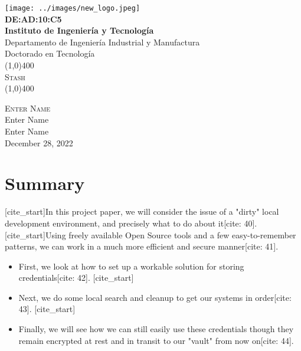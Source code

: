 \documentclass[11pt]{article}
\newcommand{\myTitle}{Stash}
\newcommand{\myName}{Enter Name}
\newcommand{\myClass}{Enter Name}
\newcommand{\myTecher}{Enter Name}
\newcommand{\myDate}{December 28, 2022}
\begin{document}
	
	\begin{titlepage}
		\begin{center}
			\texttt{[image: ../images/new\_logo.jpeg]}\\
			\huge{\textbf{DE:AD:10:C5}} \\
			[0.25in]
			
			\textbf{\Large{Instituto de Ingeniería y Tecnología}}\\
			\Large{Departamento de Ingeniería Industrial y Manufactura}\\
			\Large{Doctorado en Tecnología}\\
			[1in]
			
			\line(1,0){400}\\
			[2mm]
			\textsc{\Large{\myTitle}} \\
			\line(1,0){400} \\
			[1in]
		\end{center}
		\begin{center}
			\textsc{\Large \myName} \\
			\myClass\\
			\myTecher\\
			[1in]
			\myDate
		\end{center}
	\end{titlepage}
	
	\section*{Summary}
	
	[cite_start]In this project paper, we will consider the issue of a "dirty" local development environment, and precisely what to do about it[cite: 40]. [cite_start]Using freely available Open Source tools and a few easy-to-remember patterns, we can work in a much more efficient and secure manner[cite: 41].
	
	\begin{itemize}
		[cite_start]\item First, we look at how to set up a workable solution for storing credentials[cite: 42].
		[cite_start]\item Next, we do some local search and cleanup to get our systems in order[cite: 43].
		[cite_start]\item Finally, we will see how we can still easily use these credentials though they remain encrypted at rest and in transit to our "vault" from now on[cite: 44].
	\end{itemize}
	
\end{document}

